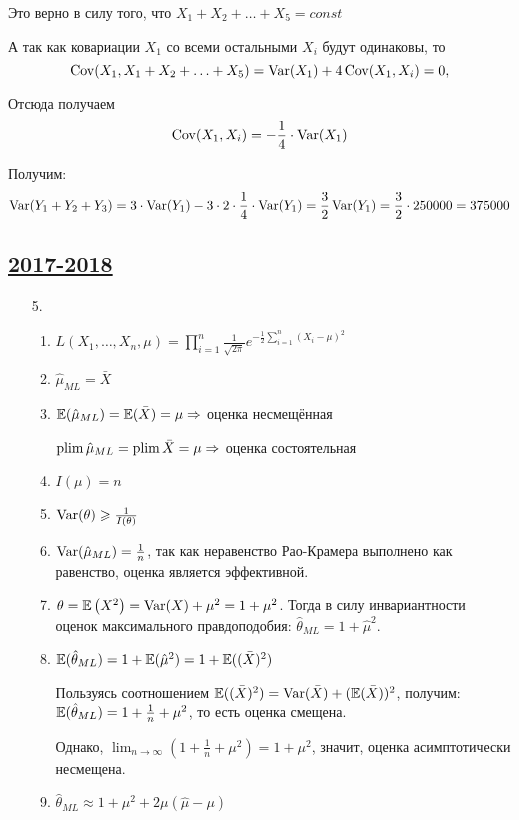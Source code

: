 \begin{enumerate}[resume]
  Это верно в силу того, что $X_1 + X_2 + \ldots + X_5 = const $

 А так как ковариации $X_1$ со всеми остальными $X_i$ будут одинаковы, то 
\[  \operatorname{Cov} (X_1, X_1 + X_2 + \ldots + X_5) = \operatorname{Var} (X_1) + 4 \operatorname{Cov} (X_1, X_i) = 0, \] 

 Отсюда получаем 
\[ \operatorname{Cov} (X_1, X_i) = - \frac{1}{4} \cdot \operatorname{Var} (X_1) \]
 
Получим: 
\[
 \operatorname{Var} (Y_1 + Y_2 + Y_3) = 3 \cdot \operatorname{Var} (Y_1) - 3 \cdot 2 \cdot \frac{1}{4} \cdot \operatorname{Var} (Y_1) 
  = \frac{3}{2}  \operatorname{Var} (Y_1) = \frac{3}{2} \cdot 250000 = 375000 
 \]

\subsection[2017-2018]{\hyperref[sec:kr_03_2017_2018]{2017-2018}}
\label{sec:sol_kr_03_2017_2018}


\begin{enumerate}
\item[5.]
\begin{enumerate}
\item $L(X_1, \ldots, X_n, \mu) = \prod_{i=1}^n \frac{1}{\sqrt{2\pi}} e^{-\frac{1}{2}\sum_{i=1}^n (X_i - \mu)^2}$
\item $\hat\mu_{ML} = \bar X$
\item $\operatorname{\mathbb{E}}(\hat\mu_{ML}) = \operatorname{\mathbb{E}}(\bar X) = \mu \Rightarrow$ оценка несмещённая

$\operatorname*{plim} \hat \mu_{ML} = \operatorname*{plim} \bar X = \mu \Rightarrow$ оценка состоятельная
\item $I(\mu) = n$
\item $\operatorname{Var}(\theta) \geqslant \frac{1}{I(\theta)}$
\item $\operatorname{Var}(\hat \mu_{ML}) = \frac{1}{n}$, так как неравенство Рао-Крамера выполнено
как равенство, оценка является эффективной.
\item $\theta = \operatorname{\mathbb{E}}\left(X^2\right) = \operatorname{Var}(X) + \mu^2 = 1 + \mu^2$.
Тогда в силу инвариантности оценок максимального правдоподобия: $\hat\theta_{ML} = 1 + \hat\mu^2$.
\item $\operatorname{\mathbb{E}}(\hat \theta_{ML}) = 1 + \operatorname{\mathbb{E}}(\hat \mu^2) = 1 + \operatorname{\mathbb{E}}((\bar X)^2)$

Пользуясь соотношением $\operatorname{\mathbb{E}}((\bar X)^2) = \operatorname{Var}(\bar X) + (\operatorname{\mathbb{E}}(\bar X))^2$,
получим: $\operatorname{\mathbb{E}}(\hat \theta_{ML}) = 1 + \frac{1}{n} + \mu^2$, то есть оценка смещена.

Однако, $\lim_{n \to \infty} \left(1 + \frac{1}{n} + \mu^2\right) = 1 + \mu^2$, значит,
оценка асимптотически несмещена.
\item $\hat \theta_{ML} \approx 1 + \mu^2 + 2\mu(\hat \mu - \mu)$


\end{enumerate}
\end{enumerate}
\end{enumerate}
